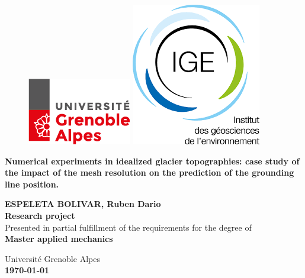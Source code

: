\thispagestyle{empty}
\begin{center}
    	\begin{figure} [t]
		\includegraphics[width=0.2\linewidth]{../fig/logo_UGA.png}
		\hspace{8.0cm}
		\includegraphics[width=0.2\linewidth]{../fig/logo_IGE.png}
		\vspace{2.0cm}
	    \end{figure}

        \begin{Large}
        \textbf{Numerical experiments in idealized glacier topographies: case study of the impact of the mesh resolution on the prediction of the grounding line position.} 
        \end{Large}
        
        \vspace{0.8cm}
        \textbf{ESPELETA BOLIVAR, Ruben Dario}\\
        \vspace{3.0cm}
        \textbf{Research project}\\
	    Presented in partial fulfillment of the requirements for the degree of\\
	    \textbf{Master applied mechanics}\\
        \vspace{3.0cm}

        Université Grenoble Alpes\\
        \textbf{\today}
        \vspace{4.0cm}
\end{center}
\clearpage
